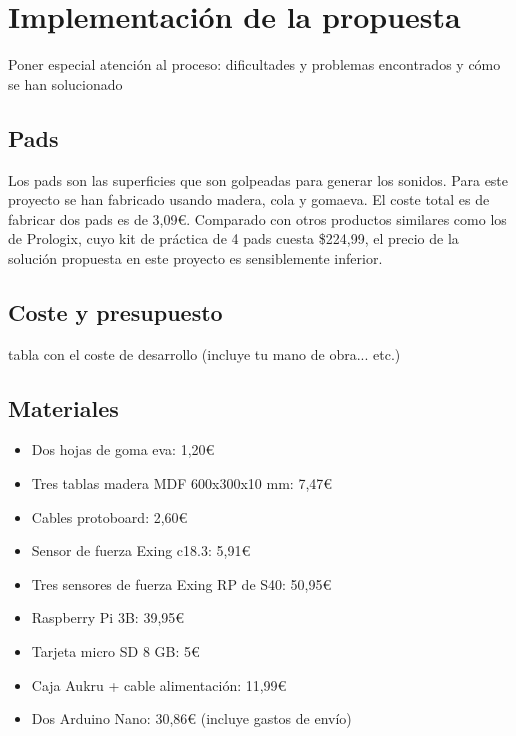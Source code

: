
\chapter{Implementación de la propuesta}
\label{cha:Implementacion}

    Poner especial atención al proceso: dificultades y problemas encontrados y cómo se han solucionado

        \section{Pads} %
        \label{sec:Pads}

            Los pads son las superficies que son golpeadas para generar los sonidos. Para este proyecto se han fabricado
            usando madera, cola y gomaeva\cite{GomaEva}. El coste total es de fabricar dos pads es de 3,09\euro{}.
            Comparado con otros productos similares como los de Prologix\cite{practice_pad}, cuyo kit de práctica de 4
            pads cuesta \$224,99, el precio de la solución propuesta en este proyecto es sensiblemente inferior.


        \section{Coste y presupuesto} %
        \label{sec:CosteYPresupuesto}

            tabla con el coste de desarrollo (incluye tu mano de obra... etc.)


        \section{Materiales} %
        \label{sec:Materiales}

            \begin{itemize}
                \item Dos hojas de goma eva: 1,20\euro{}
                \item Tres tablas madera MDF 600x300x10 mm: 7,47\euro{}
                \item Cables protoboard: 2,60\euro{}
                \item Sensor de fuerza Exing c18.3: 5,91\euro{}
                \item Tres sensores de fuerza Exing RP de S40: 50,95\euro{}
                \item Raspberry Pi 3B: 39,95\euro{}
                \item Tarjeta micro SD 8 GB: 5\euro{}
                \item Caja Aukru + cable alimentación: 11,99\euro{}
                \item Dos Arduino Nano: 30,86\euro{} (incluye gastos de envío)
            \end{itemize}

